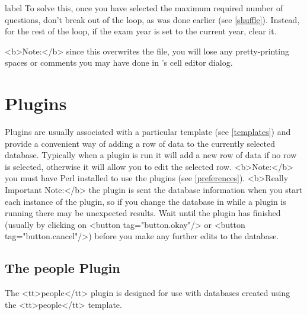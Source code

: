 \begin{example}{label}{}
   To solve this, once you have selected the maximum required number of
   questions, don't break out of the loop, as was done earlier (see
   \autoref{shuffle}). Instead, for the rest of the loop, if the exam
   year is set to the current year, clear it.



   <b>Note:</b> since this overwrites the  file, you will
   lose any pretty-printing spaces or comments you may have done in 
   's cell editor dialog.

\end{example}

\section{Plugins}\label{plugins}

   Plugins are usually associated with a particular template 
   (see \autoref{templates}) and provide a convenient way of
   adding a row of data to the currently selected database.
   Typically when a plugin is run it will add a new row of data 
   if no row is selected, otherwise it will allow you to edit the selected row.
   <b>Note:</b> you must have Perl installed to use the plugins (see 
   \autoref{preferences}). <b>Really Important Note:</b> the plugin is
   sent the database information when you start each instance of the plugin, 
   so if you change the database in  while a plugin is running 
   there may be unexpected results. Wait until the plugin has finished 
   (usually by clicking on <button tag="button.okay"/> or 
   <button tag="button.cancel"/>) before you make any further edits to the 
   database.


\subsection{The people Plugin}\label{peopleplugin}

   The <tt>people</tt> plugin is designed for use with databases created
   using the <tt>people</tt> template.

